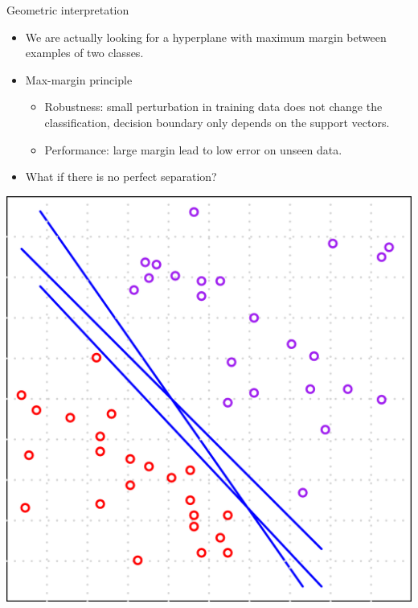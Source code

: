 \documentclass[first=dgreen,second=purple,logo=yellowexc]{aaltoslides}
\begin{document}
{\begin{frame}{Geometric interpretation}
	\begin{itemize}
		\item We are actually looking for a hyperplane with maximum margin between examples of two classes.
		\item Max-margin principle
		\begin{itemize}
			\footnotesize
			\item Robustness: small perturbation in training data does not change the classification, decision boundary only depends on the support vectors.
			\item Performance: large margin lead to low error on unseen data.
		\end{itemize}
		\item What if there is no perfect separation?
	\end{itemize}
	\begin{center}
		\includegraphics[scale=0.1]{./figures/empirical_risk_2.pdf}
		\text{      }

\end{center}
\end{frame}}
\end{document}
